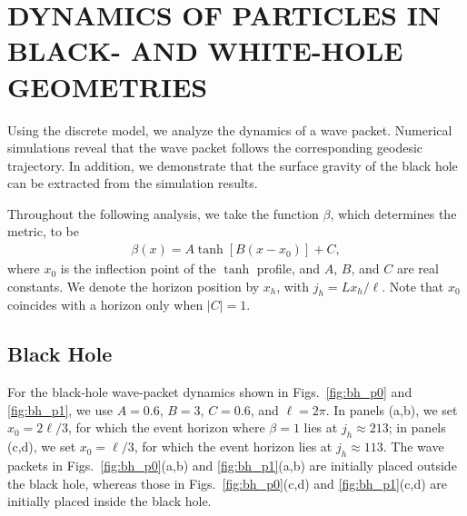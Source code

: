 \documentclass[reprint,amsmath,amssymb,aps,showkeys,superscriptaddress]{revtex4-2}
\begin{document}
\section{DYNAMICS OF PARTICLES IN BLACK- AND WHITE-HOLE GEOMETRIES}
\label{sec:dynamics}
Using the discrete model, we analyze the dynamics of a wave packet. Numerical simulations reveal that the wave packet follows the corresponding geodesic trajectory. In addition, we demonstrate that the surface gravity of the black hole can be extracted from the simulation results.

Throughout the following analysis, we take the function $\beta$, which determines the metric, to be
\begin{align}
\beta(x) = A\tanh\left[B(x-x_0)\right] + C,
\end{align}
where $x_0$ is the inflection point of the $\tanh$ profile, and $A$, $B$, and $C$ are real constants. We denote the horizon position by $x_h$, with $j_h=Lx_h/\ell$.
Note that $x_0$ coincides with a horizon only when $|C|=1$.

\subsection{Black Hole}
For the black-hole wave-packet dynamics shown in Figs.~\ref{fig:bh_p0} and \ref{fig:bh_p1}, we use $A=0.6$, $B=3$, $C=0.6$, and $\ell=2\pi$. In panels (a,b), we set $x_0=2\ell/3$, for which the event horizon where $\beta=1$ lies at $j_h\approx213$; in panels (c,d), we set $x_0=\ell/3$, for which the event horizon lies at $j_h\approx113$. The wave packets in Figs.~\ref{fig:bh_p0}(a,b) and \ref{fig:bh_p1}(a,b) are initially placed outside the black hole, whereas those in Figs.~\ref{fig:bh_p0}(c,d) and \ref{fig:bh_p1}(c,d) are initially placed inside the black hole.
\end{document}
